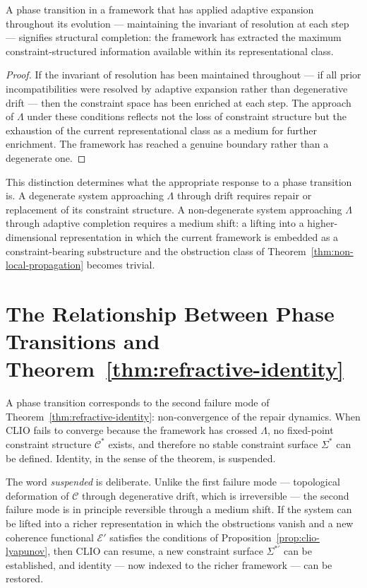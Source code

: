 \documentclass[11pt,openany]{book}
\begin{document}
\begin{proposition}
\label{prop:structural-completion}
A phase transition in a framework that has applied adaptive
expansion throughout its evolution --- maintaining the
invariant of resolution at each step --- signifies
structural completion: the framework has extracted the
maximum constraint-structured information available within
its representational class.
\end{proposition}

\begin{proof}
If the invariant of resolution has been maintained
throughout --- if all prior incompatibilities were resolved
by adaptive expansion rather than degenerative drift ---
then the constraint space has been enriched at each step.
The approach of $\Lambda$ under these conditions reflects
not the loss of constraint structure but the exhaustion of
the current representational class as a medium for further
enrichment.  The framework has reached a genuine boundary
rather than a degenerate one.
\end{proof}

This distinction determines what the appropriate response
to a phase transition is.  A degenerate system approaching
$\Lambda$ through drift requires repair or replacement of
its constraint structure.  A non-degenerate system
approaching $\Lambda$ through adaptive completion requires
a medium shift: a lifting into a higher-dimensional
representation in which the current framework is embedded
as a constraint-bearing substructure and the obstruction
class of Theorem~\ref{thm:non-local-propagation} becomes
trivial.

\section{The Relationship Between Phase Transitions
  and Theorem~\ref{thm:refractive-identity}}
\label{sec:relation-theorem}

A phase transition corresponds to the second failure mode
of Theorem~\ref{thm:refractive-identity}: non-convergence
of the repair dynamics.  When CLIO fails to converge
because the framework has crossed $\Lambda$, no fixed-point
constraint structure $\mathcal{C}^*$ exists, and therefore
no stable constraint surface $\Sigma^*$ can be defined.
Identity, in the sense of the theorem, is suspended.

The word \emph{suspended} is deliberate.  Unlike the
first failure mode --- topological deformation of
$\mathcal{C}$ through degenerative drift, which is
irreversible --- the second failure mode is in principle
reversible through a medium shift.  If the system can be
lifted into a richer representation in which the
obstructions vanish and a new coherence functional
$\mathcal{E}'$ satisfies the conditions of
Proposition~\ref{prop:clio-lyapunov}, then CLIO can
resume, a new constraint surface $\Sigma^{*\prime}$ can be
established, and identity --- now indexed to the richer
framework --- can be restored.
\end{document}
